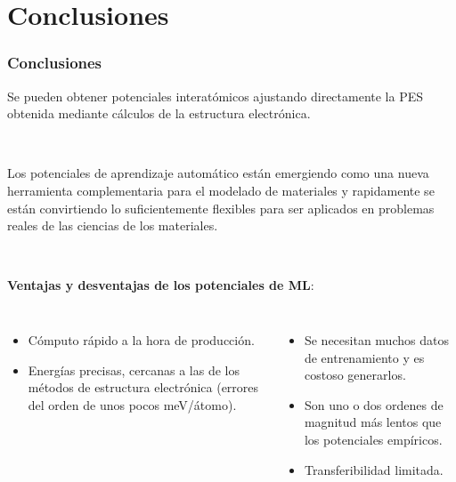 \documentclass[aspectratio=169]{beamer}
\let\oldtextbf\textbf
\renewcommand{\textbf}[1]{\textcolor{nordblue}{\oldtextbf{#1}}}
\begin{document}
    \section{Conclusiones}

    \begin{frame}
        \frametitle{Conclusiones}

        Se pueden obtener potenciales interatómicos ajustando directamente la
        PES obtenida mediante cálculos de la estructura electrónica.
        
        \ \pause

        Los potenciales de aprendizaje automático están emergiendo como una nueva
        herramienta complementaria para el modelado de materiales y rapidamente 
        se están convirtiendo lo suficientemente flexibles para ser aplicados 
        en problemas reales de las ciencias de los materiales.


        \ \pause

        \textbf{Ventajas y desventajas de los potenciales de ML}:

        \pause 

        \begin{columns}
            \begin{itemize}
                \item Cómputo rápido a la hora de producción.
                \item Energías precisas, cercanas a las de los métodos de 
                    estructura electrónica (errores del orden de unos pocos 
                    meV/átomo).
            \end{itemize}

            \pause

            \begin{itemize}
                \item Se necesitan muchos datos de entrenamiento y es costoso 
                    generarlos.
                \item Son uno o dos ordenes de magnitud más lentos que los 
                    potenciales empíricos.
                \item Transferibilidad limitada. 
            \end{itemize}
        \end{columns}

    \end{frame}
\end{document}
